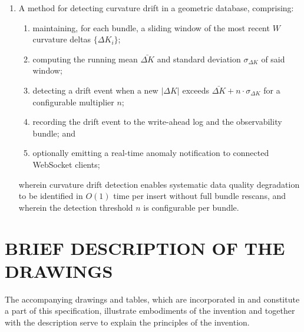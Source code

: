 \documentclass[11pt,letterpaper]{article}
\begin{document}
\begin{enumerate}
\item A method for detecting curvature drift in a geometric database, comprising:
\begin{enumerate}[label=(\alph*)]
  \item maintaining, for each bundle, a sliding window of the most recent $W$ curvature deltas $\{\Delta K_i\}$;
  \item computing the running mean $\bar{\Delta K}$ and standard deviation $\sigma_{\Delta K}$ of said window;
  \item detecting a drift event when a new $|\Delta K|$ exceeds $\bar{\Delta K} + n \cdot \sigma_{\Delta K}$ for a configurable multiplier $n$;
  \item recording the drift event to the write-ahead log and the observability bundle; and
  \item optionally emitting a real-time anomaly notification to connected WebSocket clients;
\end{enumerate}
wherein curvature drift detection enables systematic data quality degradation to be identified in $O(1)$ time per insert without full bundle rescans, and wherein the detection threshold $n$ is configurable per bundle.

\end{enumerate}


\newpage
\section*{BRIEF DESCRIPTION OF THE DRAWINGS}

The accompanying drawings and tables, which are incorporated in and constitute a
part of this specification, illustrate embodiments of the invention and together
with the description serve to explain the principles of the invention.
\end{document}
